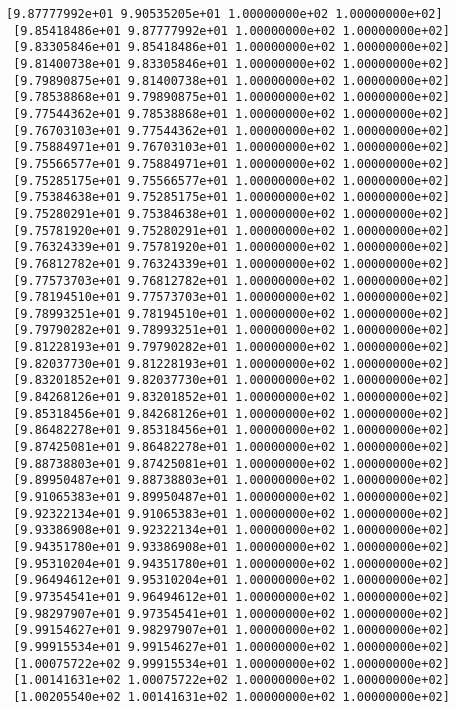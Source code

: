 \documentclass[11pt]{article}
\begin{document}
\begin{Verbatim}[commandchars=\\\{\}]
 [9.87777992e+01 9.90535205e+01 1.00000000e+02 1.00000000e+02]
 [9.85418486e+01 9.87777992e+01 1.00000000e+02 1.00000000e+02]
 [9.83305846e+01 9.85418486e+01 1.00000000e+02 1.00000000e+02]
 [9.81400738e+01 9.83305846e+01 1.00000000e+02 1.00000000e+02]
 [9.79890875e+01 9.81400738e+01 1.00000000e+02 1.00000000e+02]
 [9.78538868e+01 9.79890875e+01 1.00000000e+02 1.00000000e+02]
 [9.77544362e+01 9.78538868e+01 1.00000000e+02 1.00000000e+02]
 [9.76703103e+01 9.77544362e+01 1.00000000e+02 1.00000000e+02]
 [9.75884971e+01 9.76703103e+01 1.00000000e+02 1.00000000e+02]
 [9.75566577e+01 9.75884971e+01 1.00000000e+02 1.00000000e+02]
 [9.75285175e+01 9.75566577e+01 1.00000000e+02 1.00000000e+02]
 [9.75384638e+01 9.75285175e+01 1.00000000e+02 1.00000000e+02]
 [9.75280291e+01 9.75384638e+01 1.00000000e+02 1.00000000e+02]
 [9.75781920e+01 9.75280291e+01 1.00000000e+02 1.00000000e+02]
 [9.76324339e+01 9.75781920e+01 1.00000000e+02 1.00000000e+02]
 [9.76812782e+01 9.76324339e+01 1.00000000e+02 1.00000000e+02]
 [9.77573703e+01 9.76812782e+01 1.00000000e+02 1.00000000e+02]
 [9.78194510e+01 9.77573703e+01 1.00000000e+02 1.00000000e+02]
 [9.78993251e+01 9.78194510e+01 1.00000000e+02 1.00000000e+02]
 [9.79790282e+01 9.78993251e+01 1.00000000e+02 1.00000000e+02]
 [9.81228193e+01 9.79790282e+01 1.00000000e+02 1.00000000e+02]
 [9.82037730e+01 9.81228193e+01 1.00000000e+02 1.00000000e+02]
 [9.83201852e+01 9.82037730e+01 1.00000000e+02 1.00000000e+02]
 [9.84268126e+01 9.83201852e+01 1.00000000e+02 1.00000000e+02]
 [9.85318456e+01 9.84268126e+01 1.00000000e+02 1.00000000e+02]
 [9.86482278e+01 9.85318456e+01 1.00000000e+02 1.00000000e+02]
 [9.87425081e+01 9.86482278e+01 1.00000000e+02 1.00000000e+02]
 [9.88738803e+01 9.87425081e+01 1.00000000e+02 1.00000000e+02]
 [9.89950487e+01 9.88738803e+01 1.00000000e+02 1.00000000e+02]
 [9.91065383e+01 9.89950487e+01 1.00000000e+02 1.00000000e+02]
 [9.92322134e+01 9.91065383e+01 1.00000000e+02 1.00000000e+02]
 [9.93386908e+01 9.92322134e+01 1.00000000e+02 1.00000000e+02]
 [9.94351780e+01 9.93386908e+01 1.00000000e+02 1.00000000e+02]
 [9.95310204e+01 9.94351780e+01 1.00000000e+02 1.00000000e+02]
 [9.96494612e+01 9.95310204e+01 1.00000000e+02 1.00000000e+02]
 [9.97354541e+01 9.96494612e+01 1.00000000e+02 1.00000000e+02]
 [9.98297907e+01 9.97354541e+01 1.00000000e+02 1.00000000e+02]
 [9.99154627e+01 9.98297907e+01 1.00000000e+02 1.00000000e+02]
 [9.99915534e+01 9.99154627e+01 1.00000000e+02 1.00000000e+02]
 [1.00075722e+02 9.99915534e+01 1.00000000e+02 1.00000000e+02]
 [1.00141631e+02 1.00075722e+02 1.00000000e+02 1.00000000e+02]
 [1.00205540e+02 1.00141631e+02 1.00000000e+02 1.00000000e+02]

\end{Verbatim}
\end{document}
